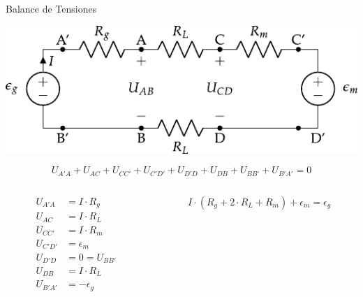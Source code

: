 \documentclass[aspectratio=169, usenames,svgnames,dvipsnames]{beamer}
\begin{document}
\begin{frame}[label={sec:org9cd0883}]{Balance de Tensiones}
\begin{center}
\includegraphics[height=0.25\textheight]{../figs/circuito_lkv.pdf}
\end{center}
\begin{equation*}
  U_{A'A} + U_{AC} + U_{CC'} + U_{C'D'} + U_{D'D} + U_{DB} + U_{BB'} + U_{B'A'} = 0
\end{equation*}

\begin{columns}
\begin{column}{0.3\columnwidth}
\begin{align*}
  U_{A'A} &= I \cdot R_g\\
  U_{AC} &= I \cdot R_L\\
  U_{CC'} &= I \cdot R_m\\
  U_{C'D'} &= \epsilon_m\\
  U_{D'D} &= 0 = U_{BB'}\\
  U_{DB} &= I \cdot R_L\\
  U_{B'A'} &= -\epsilon_g
\end{align*}
\end{column}
\begin{column}{0.7\columnwidth}
\begin{equation*}
  \boxed{I \cdot (R_g + 2\cdot R_L + R_m) + \epsilon_m = \epsilon_g}
\end{equation*}
\end{column}
\end{columns}
\end{frame}
\end{document}
